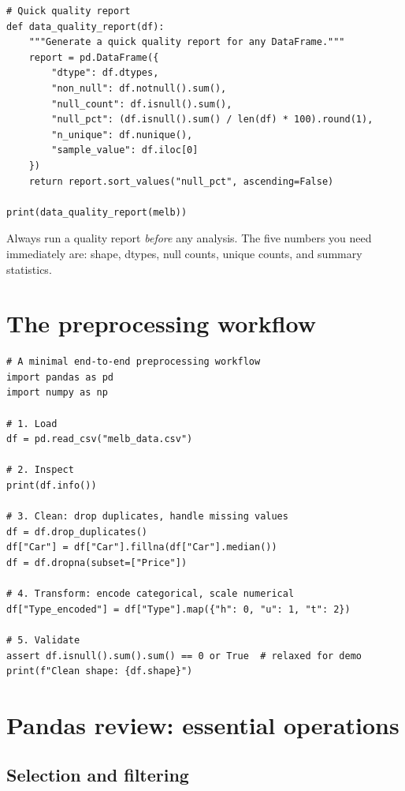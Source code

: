 \begin{verbatim}
# Quick quality report
def data_quality_report(df):
    """Generate a quick quality report for any DataFrame."""
    report = pd.DataFrame({
        "dtype": df.dtypes,
        "non_null": df.notnull().sum(),
        "null_count": df.isnull().sum(),
        "null_pct": (df.isnull().sum() / len(df) * 100).round(1),
        "n_unique": df.nunique(),
        "sample_value": df.iloc[0]
    })
    return report.sort_values("null_pct", ascending=False)

print(data_quality_report(melb))
\end{verbatim}

\begin{datatip}
Always run a quality report \emph{before} any analysis. The five numbers you need immediately are: shape, dtypes, null counts, unique counts, and summary statistics.
\end{datatip}

\section{The preprocessing workflow}

\begin{verbatim}
# A minimal end-to-end preprocessing workflow
import pandas as pd
import numpy as np

# 1. Load
df = pd.read_csv("melb_data.csv")

# 2. Inspect
print(df.info())

# 3. Clean: drop duplicates, handle missing values
df = df.drop_duplicates()
df["Car"] = df["Car"].fillna(df["Car"].median())
df = df.dropna(subset=["Price"])

# 4. Transform: encode categorical, scale numerical
df["Type_encoded"] = df["Type"].map({"h": 0, "u": 1, "t": 2})

# 5. Validate
assert df.isnull().sum().sum() == 0 or True  # relaxed for demo
print(f"Clean shape: {df.shape}")
\end{verbatim}

\section{Pandas review: essential operations}

\subsection{Selection and filtering}


